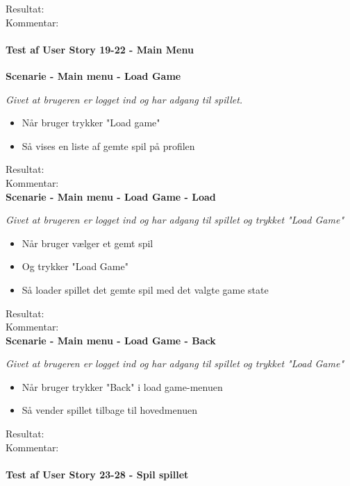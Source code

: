 Resultat:\\
Kommentar:

\paragraph{Test af User Story 19-22 - Main Menu}

\bf{Scenarie - Main menu - Load Game}

\it{Givet at brugeren er logget ind og har adgang til spillet.}

\begin{itemize}
  \item Når bruger trykker "Load game"
  \item Så vises en liste af gemte spil på profilen
\end{itemize}

Resultat:\\
Kommentar:\\

\bf{Scenarie - Main menu - Load Game - Load}

\it{Givet at brugeren er logget ind og har adgang til spillet og trykket "Load Game"}

\begin{itemize}
  \item Når bruger vælger et gemt spil
  \item Og trykker "Load Game"
  \item Så loader spillet det gemte spil med det valgte game state
\end{itemize}

Resultat:\\
Kommentar:\\

\bf{Scenarie - Main menu - Load Game - Back}

\it{Givet at brugeren er logget ind og har adgang til spillet og trykket "Load Game"}

\begin{itemize}
  \item Når bruger trykker "Back" i load game-menuen
  \item Så vender spillet tilbage til hovedmenuen
\end{itemize}

Resultat:\\
Kommentar:\\

\paragraph{Test af User Story 23-28 - Spil spillet}

